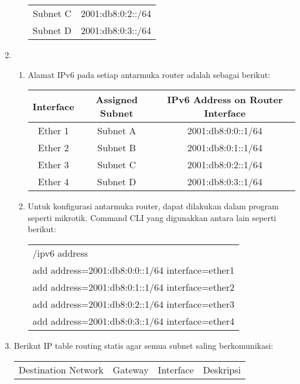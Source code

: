 \begin{enumerate}
\begin{enumerate}
{\begin{center}
\begin{tabular}{ |c|c| }
			Subnet C & 2001:db8:0:2::/64  \\
			Subnet D & 2001:db8:0:3::/64   \\
			\hline
		\end{tabular}
		\end{center}
		}
	\end{enumerate}
	\item \begin{enumerate}
		\item Alamat IPv6 pada setiap antarmuka router adalah 
		sebagai berikut:
		{\small
		\begin{center}
		\begin{tabular}{ |c|c|c| } 
			\hline
			Interface & Assigned Subnet & IPv6 Address on Router Interface  \\
			\hline
			Ether 1 & Subnet A & 2001:db8:0:0::1/64\\
			Ether 2 & Subnet B & 2001:db8:0:1::1/64 \\
			Ether 3 & Subnet C & 2001:db8:0:2::1/64  \\
			Ether 4 & Subnet D & 2001:db8:0:3::1/64   \\
			\hline
		\end{tabular}
		\end{center}
		}
		\item Untuk konfigurasi antarmuka router, dapat dilakukan 
		dalam program seperti mikrotik. Command CLI yang digunakkan 
		antara lain seperti berikut:
		{\small
		\begin{center}
		\begin{tabular}{ |l| } 
			\hline
			/ipv6 address \\
			add address=2001:db8:0:0::1/64 interface=ether1 \\
			add address=2001:db8:0:1::1/64 interface=ether2 \\
			add address=2001:db8:0:2::1/64 interface=ether3 \\
			add address=2001:db8:0:3::1/64 interface=ether4 \\
			\hline
		\end{tabular}
		\end{center}
		}
	\end{enumerate}
	\item Berikut IP table routing statis agar semua subnet saling 
	berkomunikasi:
	{\small
		\begin{center}
		\begin{tabular}{ |c|c|c|c| } 
			\hline
			Destination Network & Gateway & Interface & Deskripsi  \\

\end{tabular}
\end{center}}
\end{enumerate}
